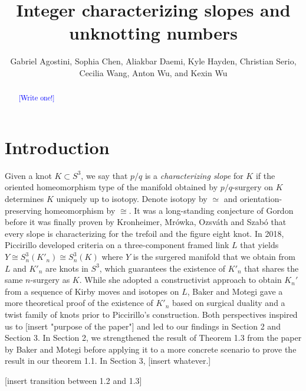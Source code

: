 \documentclass[11pt,usenames,dvipsnames,reqno]{amsart}
\numberwithin{theorem}{section}
\theoremstyle{ex}
\theoremstyle{rem}
\def\kh#1{\textcolor{Blue}{#1}}
\begin{document}


\title{Integer characterizing slopes and unknotting numbers}

\author[Agostini, Chen, Daemi, Hayden, Serio, Wang, A. Wu, and K. Wu]{Gabriel Agostini, Sophia Chen, Aliakbar Daemi, Kyle Hayden, Christian Serio, Cecilia Wang, Anton Wu, and Kexin Wu}



\begin{abstract} 
\kh{[Write one!]}
\end{abstract}


\maketitle

\section{Introduction}\label{sec:intro}

Given a knot $K\subset S^3$, we say that $p/q$  is a {\it characterizing slope} for $K$ if the oriented homeomorphism type of the manifold obtained by $p/q$-surgery on $K$ determines $K$ uniquely up to isotopy. Denote isotopy by $\simeq$ and orientation-preserving homeomorphism by $\cong$. It was a long-standing conjecture of Gordon before it was finally proven by Kronheimer, Mr\'{o}wka, Ozsv\'{a}th and Szab\'{o} that every slope is characterizing for the trefoil and the figure eight knot. In 2018, Piccirillo developed criteria on a three-component framed link $L$ that yields $Y \cong S^3_n(K'_n) \cong S^3_n(K)$ where $Y$ is the surgered manifold that we obtain from $L$ and $K'_n$ are knots in $S^3$, which guarantees the existence of $K'_n$ that shares the same $n$-surgery as $K$. While she adopted a constructivist approach to obtain $K_n'$ from a sequence of Kirby moves and isotopes on $L$, Baker and Motegi gave a more theoretical proof of the existence of $K'_n$ based on surgical duality and a twist family of knots prior to Piccirillo's construction. Both perspectives inspired us to [insert "purpose of the paper"] and led to our findings in Section 2 and Section 3. In Section 2, we strengthened the result of Theorem 1.3 from the paper by Baker and Motegi before applying it to a more concrete scenario to prove the result in our theorem 1.1. In Section 3, [insert whatever.]

[insert transition between 1.2 and 1.3]
\end{document}
